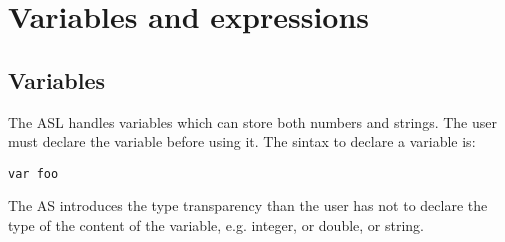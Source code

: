 \section{Variables and expressions}

\subsection{Variables}
The ASL handles variables which can store both numbers and strings. The user must declare the variable before using it. The sintax to declare a variable is:
%
\begin{lstlisting}[language={asl}, caption={Sintax to declare a variable}]
var foo
\end{lstlisting}
%
The AS introduces the type transparency than the user has not to declare the type of the content of the variable, e.g. integer, or double, or string. 

